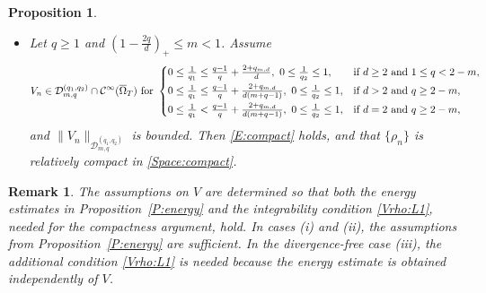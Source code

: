 \documentclass{amsart}
\newtheorem{proposition}[defn]{Proposition}
\newtheorem{remark}[defn]{Remark}
\numberwithin{equation}{section}
\newcommand{\calC}{{ \mathcal C  }}
\begin{document}
\begin{proposition}
\begin{itemize}
\item[(iii)]  Let $q\geq 1$ and $(1-\frac{2q}{d})_{+} \leq m <1$. Assume 
    \begin{equation}\label{V:divfree:compact}
  V_n\in \mathcal{D}_{m,q}^{(q_1, q_2)}\cap \calC^{\infty} (\overline{\Omega}_{T})  \text{ for } 
\begin{cases}
0 \leq \frac{1}{q_1} \leq \frac{q-1}{q}+\frac{2+q_{m,d}}{d}, \ 0 \leq \frac{1}{q_2} \leq 1, &  \text{if }  d\geq 2  \text{ and }  1\leq q<2-m,
\vspace{1mm}\\
	0 \leq \frac{1}{q_1} \leq \frac{q-1}{q}+\frac{2+q_{m,d}}{d(m+q-1)}, \ 0 \leq \frac{1}{q_2} \leq 1, &\text{if } d>2 \text{ and } q \geq 2-m,  \vspace{1 mm} \\
	 0 \leq \frac{1}{q_1} < \frac{q-1}{q}+\frac{2+q_{m,d}}{d(m+q-1)}, \ 0 \leq  \frac{1}{q_2} \leq 1, &\text{if }  d=2 \text{ and } q \geq 2-m, 
\end{cases}
\end{equation}
and  $\|V_n\|_{\mathcal{D}_{m,q}^{(q_1, q_2)}}$  is bounded. Then \eqref{E:compact} holds, and that $\{\rho_n\}$ is relatively compact in \eqref{Space:compact}.
	\end{itemize}
\end{proposition}

\begin{remark}
The assumptions on $V$ are determined so that both the energy estimates in Proposition~\ref{P:energy} and the integrability condition \eqref{Vrho:L1}, needed for the compactness argument, hold. In cases (i) and (ii), the assumptions from Proposition~\ref{P:energy} are sufficient. In the divergence-free case (iii), the additional condition \eqref{Vrho:L1} is needed because the energy estimate is obtained independently of $V$.
\end{remark}
\end{document}
